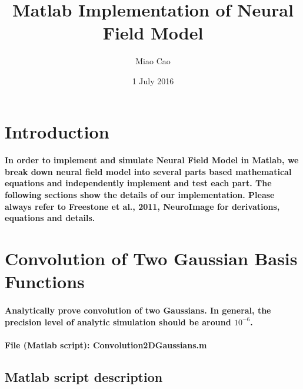 \documentclass[a4paper, 12pt, english]{article}
\title{Matlab Implementation of Neural Field Model}
\author{Miao Cao}
\date{1 July 2016}
\begin{document}
\begin{titlepage}\centering
\vspace*{\fill}
\maketitle
\vspace*{\fill}
\end{titlepage}

\tableofcontents

\newpage



\section{Introduction}
\paragraph{In order to implement and simulate Neural Field Model in Matlab, we break down
neural field model into several parts based mathematical equations and independently implement and test each part. The
following sections show the details of our implementation. Please always refer to
Freestone et al., 2011, NeuroImage for derivations, equations and details.}

\newpage




\section{Convolution of Two Gaussian Basis Functions}

\paragraph{Analytically prove convolution of two Gaussians. In general, the
precision level of analytic simulation should be around $10^{-6}$.}

\paragraph{File (Matlab script): Convolution2DGaussians.m}

\subsection*{Matlab script description}
\end{document}
